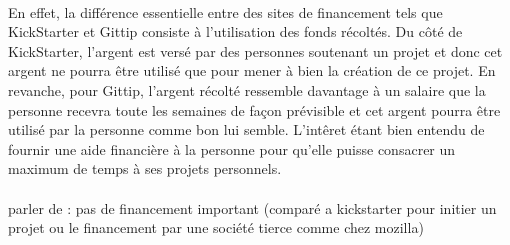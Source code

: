 \paragraph{} En effet, la différence essentielle entre des sites de financement
tels que KickStarter et Gittip consiste à l'utilisation des fonds récoltés. Du
côté de KickStarter, l'argent est versé par des personnes soutenant un projet
et donc cet argent ne pourra être utilisé que pour mener à bien la création de
ce projet. En revanche, pour Gittip, l'argent récolté ressemble davantage à un
salaire que la personne recevra toute les semaines de façon prévisible et cet
argent pourra être utilisé par la personne comme bon lui semble. L'intêret
étant bien entendu de fournir une aide financière à la personne pour qu'elle
puisse consacrer un maximum de temps à ses projets personnels.

\paragraph{} parler de : pas de financement important (comparé a kickstarter
pour initier un projet ou le financement par une société tierce comme chez
mozilla)


